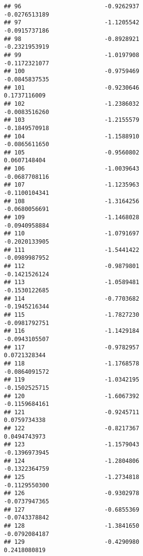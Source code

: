 \documentclass[
]{article}
\begin{document}
\begin{verbatim}
## 96                        -0.9262937                         -0.0276513189
## 97                        -1.1205542                         -0.0915737186
## 98                        -0.8928921                         -0.2321953919
## 99                        -1.0197908                         -0.1172321077
## 100                       -0.9759469                         -0.0845837535
## 101                       -0.9230646                          0.1737116009
## 102                       -1.2386032                         -0.0083516260
## 103                       -1.2155579                         -0.1849570918
## 104                       -1.1588910                         -0.0865611650
## 105                       -0.9560802                          0.0607148404
## 106                       -1.0039643                         -0.0687708116
## 107                       -1.1235963                         -0.1100104341
## 108                       -1.3164256                         -0.0680056691
## 109                       -1.1468028                         -0.0940958884
## 110                       -1.0791697                         -0.2020133905
## 111                       -1.5441422                         -0.0989987952
## 112                       -0.9879801                         -0.1421526124
## 113                       -1.0589481                         -0.1530122685
## 114                       -0.7703682                         -0.1945216344
## 115                       -1.7827230                         -0.0981792751
## 116                       -1.1429184                         -0.0943105507
## 117                       -0.9782957                          0.0721328344
## 118                       -1.1768578                         -0.0864091572
## 119                       -1.0342195                         -0.1502525715
## 120                       -1.6067392                         -0.1159684161
## 121                       -0.9245711                          0.0759734338
## 122                       -0.8217367                          0.0494743973
## 123                       -1.1579043                         -0.1396973945
## 124                       -1.2804806                         -0.1322364759
## 125                       -1.2734818                         -0.1129550300
## 126                       -0.9302978                         -0.0737947365
## 127                       -0.6855369                         -0.0743378842
## 128                       -1.3841650                         -0.0792084187
## 129                       -0.4290980                          0.2418080819

\end{verbatim}
\end{document}
